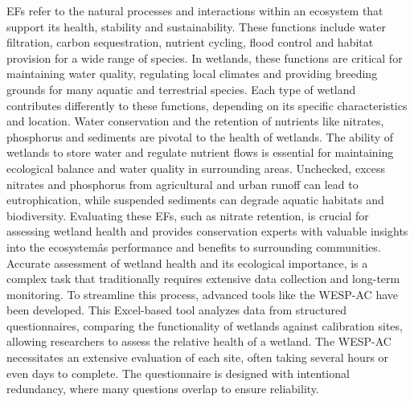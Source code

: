 \documentclass[12pt,letterpaper]{article}
\begin{document}
\ac{EF}s refer to the natural processes and interactions within an ecosystem that support its health, stability and sustainability.
These functions include water filtration, carbon sequestration, nutrient cycling, flood control and habitat provision for a wide range of species.
In wetlands, these functions are critical for maintaining water quality, regulating local climates and providing breeding grounds for many aquatic and terrestrial species.
Each type of wetland contributes differently to these functions, depending on its specific characteristics and location.
Water conservation and the retention of nutrients like nitrates, phosphorus and sediments are pivotal to the health of wetlands.
The ability of wetlands to store water and regulate nutrient flows is essential for maintaining ecological balance and water quality in surrounding areas.
Unchecked, excess nitrates and phosphorus from agricultural and urban runoff can lead to eutrophication, while suspended sediments can degrade aquatic habitats and biodiversity.
Evaluating these \ac{EF}s, such as nitrate retention, is crucial for assessing wetland health and provides conservation experts with valuable insights into the ecosystemâs performance and benefits to surrounding communities.
Accurate assessment of wetland health and its ecological importance, is a complex task that traditionally requires extensive data collection and long-term monitoring.
To streamline this process, advanced tools like the \ac{WESP-AC} have been developed.
This Excel-based tool analyzes data from structured questionnaires, comparing the functionality of wetlands against calibration sites, allowing researchers to assess the relative health of a wetland.
The \ac{WESP-AC} necessitates an extensive evaluation of each site, often taking several hours or even days to complete.
The questionnaire is designed with intentional redundancy, where many questions overlap to ensure reliability.
\end{document}
